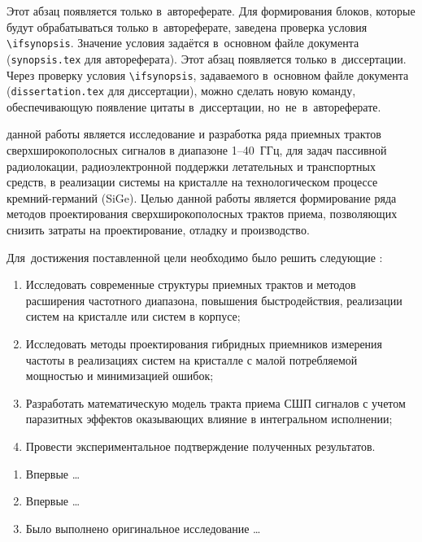 \ifsynopsis
Этот абзац появляется только в~автореферате.
Для формирования блоков, которые будут обрабатываться только в~автореферате,
заведена проверка условия \verb!\!\verb!ifsynopsis!.
Значение условия задаётся в~основном файле документа (\verb!synopsis.tex! для
автореферата).
\else
Этот абзац появляется только в~диссертации.
Через проверку условия \verb!\!\verb!ifsynopsis!, задаваемого в~основном файле
документа (\verb!dissertation.tex! для диссертации), можно сделать новую
команду, обеспечивающую появление цитаты в~диссертации, но~не~в~автореферате.
\fi


{\aim} данной работы является исследование и разработка ряда приемных трактов сверхширокополосных сигналов в диапазоне \numrange[]{1}{40}~ГГц, для задач пассивной радиолокации, радиоэлектронной поддержки летательных и транспортных средств, в реализации системы на кристалле на технологическом процессе кремний-германий (SiGe). Целью данной работы является формирование ряда методов проектирования сверхширокополосных трактов приема, позволяющих снизить затраты на проектирование, отладку и производство.

Для~достижения поставленной цели необходимо было решить следующие {\tasks}:
\begin{enumerate}[beginpenalty=10000] %
  \item Исследовать современные структуры приемных трактов и методов расширения частотного диапазона, повышения быстродействия, реализации систем на кристалле или систем в корпусе;
  \item Исследовать методы проектирования гибридных приемников измерения частоты в реализациях систем на кристалле с малой потребляемой мощностью и минимизацией ошибок;
  \item Разработать математическую модель тракта приема СШП сигналов с учетом паразитных эффектов оказывающих влияние в интегральном исполнении;
  \item Провести экспериментальное подтверждение полученных результатов.
\end{enumerate}

{\novelty}
\begin{enumerate}[beginpenalty=10000] %
  \item Впервые \ldots
  \item Впервые \ldots
  \item Было выполнено оригинальное исследование \ldots
\end{enumerate}


